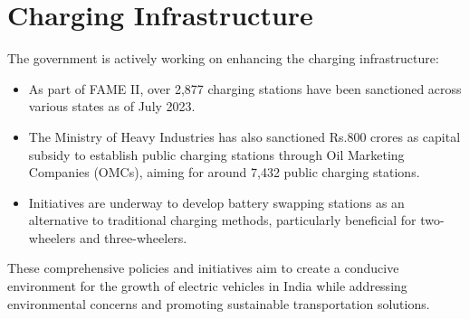 \documentclass[a4paper,12pt]{report}
\begin{document}
\section{Charging Infrastructure}
The government is actively working on enhancing the charging infrastructure:
\begin{itemize}
    \item As part of FAME II, over 2,877 charging stations have been sanctioned across various states as of July 2023.
    \item The Ministry of Heavy Industries has also sanctioned Rs.800 crores as capital subsidy to establish public charging stations through Oil Marketing Companies (OMCs), aiming for around 7,432 public charging stations.
    \item Initiatives are underway to develop battery swapping stations as an alternative to traditional charging methods, particularly beneficial for two-wheelers and three-wheelers.
\end{itemize}


These comprehensive policies and initiatives aim to create a conducive environment for the growth of electric vehicles in India while addressing environmental concerns and promoting sustainable transportation solutions.
\end{document}
